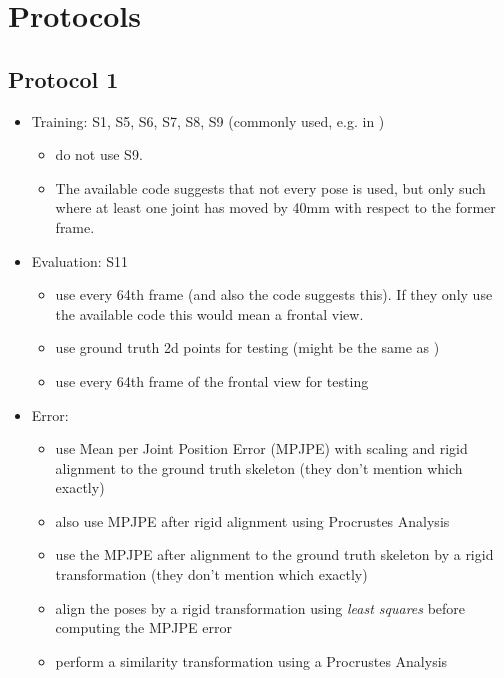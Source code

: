 \documentclass[11pt]{article}
\begin{document}
	\section{Protocols}
	\subsection{Protocol 1}
		\begin{itemize}
			\item Training: S1, S5, S6, S7, S8, S9 (commonly used, e.g. in \cite{chen17})
			\begin{itemize}
				\item \cite{drover18} do not use S9.
				\item The available code suggests that not every pose is used, but only such where at least one joint has moved by 40mm with respect to the former frame.
			\end{itemize} 			
			\item Evaluation: S11
			\begin{itemize}
				\item \cite{sun17} use every 64th frame (and also the code suggests this). If they only use the available code this would mean a frontal view.
				\item \cite{drover18} use ground truth 2d points for testing (might be the same as \cite{sun17})
				\item \cite{moreno-noguer16} use every 64th frame of the frontal view for testing
			\end{itemize}

			\item Error: \begin{itemize}
				\item \cite{drover18} use Mean per Joint Position Error (MPJPE) with scaling and rigid alignment to the ground truth skeleton (they don't mention which exactly)
				\item \cite{sun17} also use MPJPE after rigid alignment using Procrustes Analysis
				\item \cite{yasin16} use the MPJPE after alignment to the ground truth skeleton by a rigid transformation (they don't mention which exactly)
				\item \cite{kostrikov14} align the poses by a rigid transformation using \emph{least squares} before computing the MPJPE error
				\item \cite{tome17} perform a similarity transformation using a Procrustes Analysis
			\end{itemize}
			
		\end{itemize}
\end{document}
